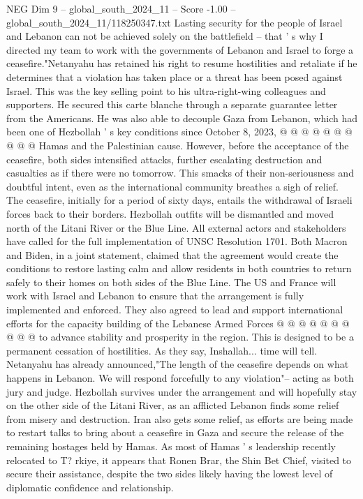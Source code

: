 \begin{textsample}{NEG Dim 9 – global\_south\_2024\_11 – Score -1.00 – global\_south\_2024\_11/118250347.txt}
Lasting security for the people of Israel and Lebanon can not be achieved solely on the battlefield -- that ' s why I directed my team to work with the governments of Lebanon and Israel to forge a ceasefire."Netanyahu has retained his right to resume hostilities and retaliate if he determines that a violation has taken place or a threat has been posed against Israel.
This was the key selling point to his ultra-right-wing colleagues and supporters.
He secured this carte blanche through a separate guarantee letter from the Americans.
He was also able to decouple Gaza from Lebanon, which had been one of Hezbollah ' s key conditions since October 8, 2023, @ @ @ @ @ @ @ @ @ @ Hamas and the Palestinian cause.
However, before the acceptance of the ceasefire, both sides intensified attacks, further escalating destruction and casualties as if there were no tomorrow.
This smacks of their non-seriousness and doubtful intent, even as the international community breathes a sigh of relief.
The ceasefire, initially for a period of sixty days, entails the withdrawal of Israeli forces back to their borders.
Hezbollah outfits will be dismantled and moved north of the Litani River or the Blue Line.
All external actors and stakeholders have called for the full implementation of UNSC Resolution 1701.
Both Macron and Biden, in a joint statement, claimed that the agreement would create the conditions to restore lasting calm and allow residents in both countries to return safely to their homes on both sides of the Blue Line.
The US and France will work with Israel and Lebanon to ensure that the arrangement is fully implemented and enforced.
They also agreed to lead and support international efforts for the capacity building of the Lebanese Armed Forces @ @ @ @ @ @ @ @ @ @ to advance stability and prosperity in the region.
This is designed to be a permanent cessation of hostilities.
As they say, Inshallah... time will tell.
Netanyahu has already announced,"The length of the ceasefire depends on what happens in Lebanon.
We will respond forcefully to any violation"-- acting as both jury and judge.
Hezbollah survives under the arrangement and will hopefully stay on the other side of the Litani River, as an afflicted Lebanon finds some relief from misery and destruction.
Iran also gets some relief, as efforts are being made to restart talks to bring about a ceasefire in Gaza and secure the release of the remaining hostages held by Hamas.
As most of Hamas ' s leadership recently relocated to T? rkiye, it appears that Ronen Brar, the Shin Bet Chief, visited to secure their assistance, despite the two sides likely having the lowest level of diplomatic confidence and relationship.

\end{textsample}
